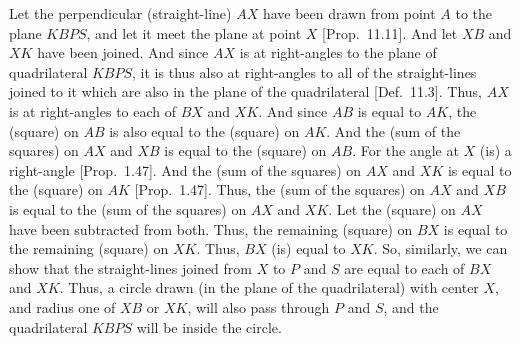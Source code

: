 Let the perpendicular (straight-line) $AX$ have been drawn from point $A$ to the plane $KBPS$, and let it meet the
plane at point $X$ [Prop.~11.11]. And let $XB$ and $XK$ have been joined. And since $AX$ is at right-angles to the plane
of quadrilateral $KBPS$, it is thus also at right-angles to all of the  straight-lines joined to it which are also in the plane of the quadrilateral
[Def.~11.3]. Thus, $AX$ is at right-angles to each of $BX$ and $XK$. And since $AB$ is equal
to $AK$, the (square) on $AB$ is also equal to the (square) on $AK$. And the (sum of the
squares) on $AX$ and $XB$ is equal to the (square) on $AB$. For the angle at $X$ (is) a right-angle [Prop.~1.47]. And the (sum of the squares) on $AX$ and $XK$ is equal to the (square) on
$AK$ [Prop.~1.47]. Thus, the (sum of the squares) on $AX$ and $XB$
is equal to the (sum of the squares) on $AX$ and $XK$. Let the (square) on $AX$ have been subtracted from both. Thus, the
remaining (square) on $BX$ is equal to the remaining (square) on $XK$. Thus, $BX$ (is) equal to $XK$. So, similarly,
we can show that  the straight-lines joined from $X$ to $P$ and $S$ are equal to each of $BX$ and $XK$.
Thus, a circle drawn (in the plane of the quadrilateral) with center $X$, and radius one of $XB$ or $XK$, will
also pass through $P$ and $S$, and the quadrilateral $KBPS$ will be inside the circle.

